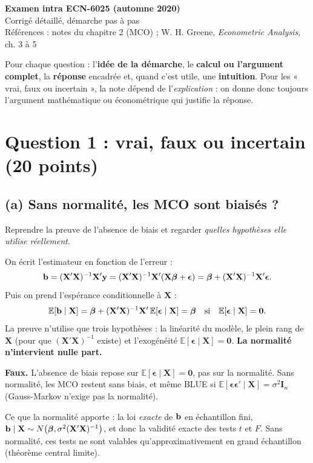 \documentclass[11pt,a4paper]{article}
\newcommand{\vy}{\mathbf{y}}\newcommand{\vX}{\mathbf{X}}\newcommand{\vZ}{\mathbf{Z}}
\newcommand{\vbeta}{\bm{\beta}}\newcommand{\veps}{\bm{\epsilon}}\newcommand{\vi}{\bm{\iota}}
\newcommand{\I}{\mathbf{I}}\newcommand{\C}{\mathbf{C}}\newcommand{\D}{\mathbf{D}}
\newcommand{\E}{\mathbb{E}}\newcommand{\Var}{\operatorname{Var}}\newcommand{\Cov}{\operatorname{Cov}}
\begin{document}
\begin{center}
{\LARGE\bfseries Examen intra ECN-6025 (automne 2020)}\\[6pt]
{\large Corrigé détaillé, démarche pas à pas}\\[4pt]
{\small Références : notes du chapitre 2 (MCO) ; W. H. Greene, \emph{Econometric Analysis}, ch. 3 à 5}
\end{center}

\begin{tcolorbox}[colback=white,colframe=NavyBlue,title=Comment lire ce corrigé]
Pour chaque question : l'\textbf{idée de la démarche}, le \textbf{calcul ou l'argument complet}, la \textbf{réponse} encadrée et, quand c'est utile, une \textbf{intuition}. Pour les « vrai, faux ou incertain », la note dépend de l'\emph{explication} : on donne donc toujours l'argument mathématique ou économétrique qui justifie la réponse.
\end{tcolorbox}

\tableofcontents

\section{Question 1 : vrai, faux ou incertain (20 points)}

\subsection*{(a) Sans normalité, les MCO sont biaisés ?}

\begin{idee}
Reprendre la preuve de l'absence de biais et regarder \emph{quelles hypothèses elle utilise réellement}.
\end{idee}

On écrit l'estimateur en fonction de l'erreur :
\[
\vb=(\vX'\vX)^{-1}\vX'\vy=(\vX'\vX)^{-1}\vX'(\vX\vbeta+\veps)=\vbeta+(\vX'\vX)^{-1}\vX'\veps .
\]
Puis on prend l'espérance conditionnelle à $\vX$ :
\[
\E[\vb\mid\vX]=\vbeta+(\vX'\vX)^{-1}\vX'\,\E[\veps\mid\vX]=\vbeta \quad\text{si}\quad \E[\veps\mid\vX]=\mathbf 0 .
\]
La preuve n'utilise que trois hypothèses : la linéarité du modèle, le plein rang de $\vX$ (pour que $(\vX'\vX)^{-1}$ existe) et l'exogénéité $\E[\veps\mid\vX]=\mathbf 0$. \textbf{La normalité n'intervient nulle part.}

\begin{reponse}
\textbf{Faux.} L'absence de biais repose sur $\E[\veps\mid\vX]=\mathbf 0$, pas sur la normalité. Sans normalité, les MCO restent sans biais, et même BLUE si $\E[\veps\veps'\mid\vX]=\sigma^2\I_n$ (Gauss-Markov n'exige pas la normalité).

Ce que la normalité apporte : la loi \emph{exacte} de $\mathbf{b}$ en échantillon fini, $\vb\mid\vX\sim N\big(\vbeta,\sigma^2(\vX'\vX)^{-1}\big)$, et donc la validité exacte des tests $t$ et $F$. Sans normalité, ces tests ne sont valables qu'approximativement en grand échantillon (théorème central limite).
\end{reponse}
\end{document}
